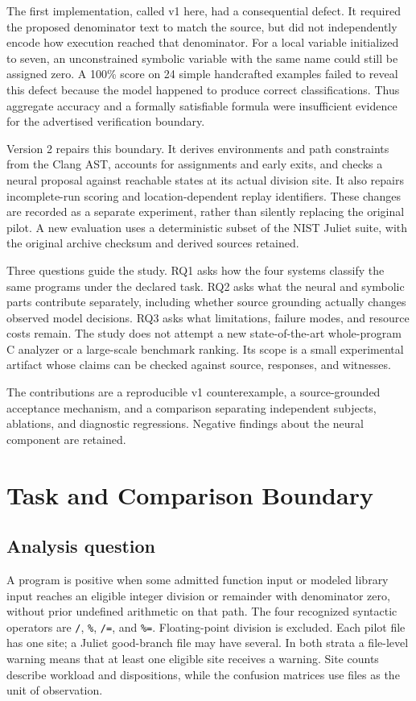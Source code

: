 \documentclass[sigconf]{acmart}
\begin{document}
The first implementation, called v1 here, had a consequential defect. It
required the proposed denominator text to match the source, but did not
independently encode how execution reached that denominator. For a local
variable initialized to seven, an unconstrained symbolic variable with the
same name could still be assigned zero. A 100\% score on 24 simple handcrafted
examples failed to reveal this defect because the model happened to produce
correct classifications. Thus aggregate accuracy and a formally satisfiable
formula were insufficient evidence for the advertised verification boundary.

Version 2 repairs this boundary. It derives environments and path constraints
from the Clang AST, accounts for assignments and early exits, and checks a
neural proposal against reachable states at its actual division site. It also
repairs incomplete-run scoring and location-dependent replay identifiers. These
changes are recorded as a separate experiment, rather than silently replacing
the original pilot. A new evaluation uses a deterministic subset of the NIST
Juliet suite, with the original archive checksum and derived sources retained.

Three questions guide the study. RQ1 asks how the four systems classify the
same programs under the declared task. RQ2 asks what the neural and symbolic
parts contribute separately, including whether source grounding actually changes
observed model decisions. RQ3 asks what limitations, failure modes, and resource
costs remain. The study does not attempt a new state-of-the-art whole-program C
analyzer or a large-scale benchmark ranking. Its scope is a small experimental
artifact whose claims can be checked against source, responses, and witnesses.

The contributions are a reproducible v1 counterexample, a source-grounded
acceptance mechanism, and a comparison separating independent subjects,
ablations, and diagnostic regressions. Negative findings about the neural
component are retained.

\section{Task and Comparison Boundary}
\subsection{Analysis question}
A program is positive when some admitted function input or modeled library
input reaches an eligible integer division or remainder with denominator zero,
without prior undefined arithmetic on that path. The four recognized syntactic
operators are \texttt{/}, \texttt{\%}, \texttt{/=}, and \texttt{\%=}. Floating-point
division is excluded. Each pilot file has one site; a Juliet good-branch file
may have several. In both strata a file-level warning means that at least one
eligible site receives a warning. Site counts describe workload and dispositions,
while the confusion matrices use files as the unit of observation.
\end{document}
